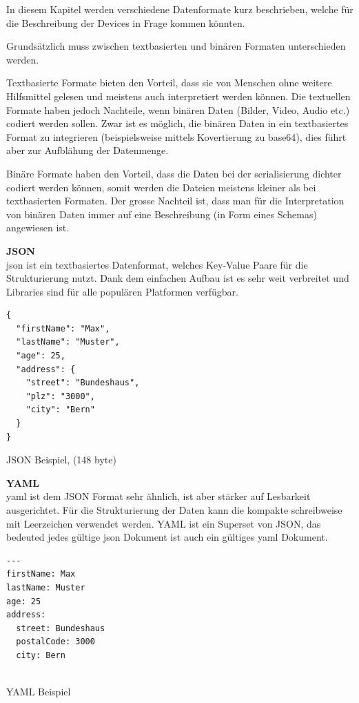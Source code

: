 In diesem Kapitel werden verschiedene Datenformate kurz beschrieben, welche für die Beschreibung der Devices in Frage kommen könnten. 

Grundsätzlich muss zwischen textbasierten und binären Formaten unterschieden werden.

Textbasierte Formate bieten den Vorteil, dass sie von Menschen ohne weitere Hilfsmittel gelesen und meistens auch interpretiert werden können. Die textuellen Formate haben jedoch Nachteile, wenn binären Daten (Bilder, Video, Audio etc.) codiert werden sollen. Zwar ist es möglich, die binären Daten in ein textbasiertes Format zu integrieren (beispielsweise mittels Kovertierung zu \gls{base64}), dies führt aber zur Aufblähung der Datenmenge.

Binäre Formate haben den Vorteil, dass die Daten bei der \gls{serialisierung} dichter codiert werden können, somit werden die Dateien meistens kleiner als bei textbasierten Formaten. Der grosse Nachteil ist, dass man für die Interpretation von binären Daten immer auf eine Beschreibung (in Form eines Schemas) angewiesen ist.

\textbf{JSON} \\
\gls{json} ist ein textbasiertes Datenformat, welches Key-Value Paare für die Strukturierung nutzt. Dank dem einfachen Aufbau ist es sehr weit verbreitet und Libraries sind für alle populären Platformen verfügbar.

\begin{listing}[H]
\begin{verbatim}
{
  "firstName": "Max",
  "lastName": "Muster",
  "age": 25,
  "address": {
    "street": "Bundeshaus",
    "plz": "3000",
    "city": "Bern"
  }
}

\end{verbatim}
\caption{JSON Beispiel, (148 byte)}
\end{listing}


\textbf{YAML} \\ 
\gls{yaml} ist dem JSON Format sehr ähnlich, ist aber stärker auf Lesbarkeit ausgerichtet. Für die Strukturierung der Daten kann die kompakte schreibweise mit Leerzeichen verwendet werden. 
YAML ist ein Superset von JSON, das bedeuted jedes gültige \gls{json} Dokument ist auch ein gültiges \gls{yaml} Dokument.

\begin{listing}[H]
\begin{verbatim}
---
firstName: Max
lastName: Muster
age: 25
address: 
  street: Bundeshaus
  postalCode: 3000
  city: Bern


\end{verbatim}
\caption{YAML Beispiel}
\end{listing}

